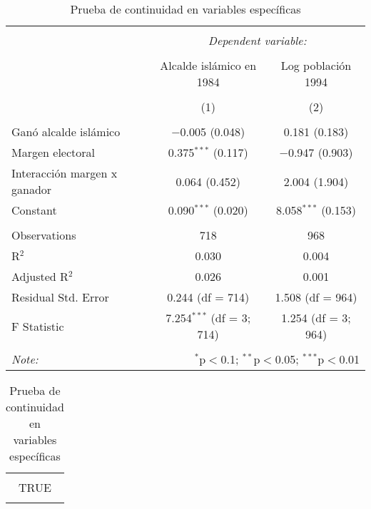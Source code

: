 
\begin{table}[ht!] \centering 
  \caption{Prueba de continuidad en variables específicas} 
  \label{tab:continuidad_predeterminadas} 
\begin{tabular}{@{\extracolsep{5pt}}lcc} 
\\[-1.8ex]\hline 
\hline \\[-1.8ex] 
 & \multicolumn{2}{c}{\textit{Dependent variable:}} \\ 
\cline{2-3} 
\\[-1.8ex] & Alcalde islámico en 1984 & Log población 1994 \\ 
\\[-1.8ex] & (1) & (2)\\ 
\hline \\[-1.8ex] 
 Ganó alcalde islámico & $-$0.005 (0.048) & 0.181 (0.183) \\ 
  Margen electoral & 0.375$^{***}$ (0.117) & $-$0.947 (0.903) \\ 
  Interacción margen x ganador & 0.064 (0.452) & 2.004 (1.904) \\ 
  Constant & 0.090$^{***}$ (0.020) & 8.058$^{***}$ (0.153) \\ 
 \hline \\[-1.8ex] 
Observations & 718 & 968 \\ 
R$^{2}$ & 0.030 & 0.004 \\ 
Adjusted R$^{2}$ & 0.026 & 0.001 \\ 
Residual Std. Error & 0.244 (df = 714) & 1.508 (df = 964) \\ 
F Statistic & 7.254$^{***}$ (df = 3; 714) & 1.254 (df = 3; 964) \\ 
\hline 
\hline \\[-1.8ex] 
\textit{Note:}  & \multicolumn{2}{r}{$^{*}$p$<$0.1; $^{**}$p$<$0.05; $^{***}$p$<$0.01} \\ 
\end{tabular} 
\end{table} 

\begin{table}[ht!] \centering 
  \caption{Prueba de continuidad en variables específicas} 
  \label{tab:continuidad_predeterminadas} 
\begin{tabular}{@{\extracolsep{5pt}} c} 
\\[-1.8ex]\hline 
\hline \\[-1.8ex] 
TRUE \\ 
\hline \\[-1.8ex] 
\end{tabular} 
\end{table} 
